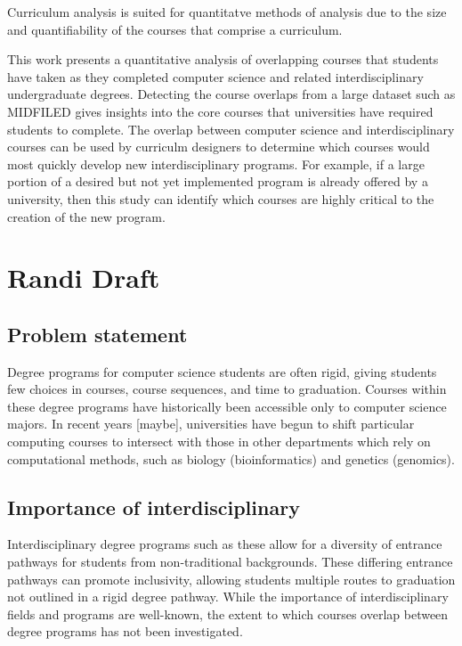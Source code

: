 \documentclass[
  journal,
]{IEEEtran}%
\begin{document}
Curriculum analysis is suited for quantitatve methods of analysis due to
the size and quantifiability of the courses that comprise a curriculum.

This work presents a quantitative analysis of overlapping courses that
students have taken as they completed computer science and related
interdisciplinary undergraduate degrees. Detecting the course overlaps
from a large dataset such as MIDFILED gives insights into the core
courses that universities have required students to complete. The
overlap between computer science and interdisciplinary courses can be
used by curriculm designers to determine which courses would most
quickly develop new interdisciplinary programs. For example, if a large
portion of a desired but not yet implemented program is already offered
by a university, then this study can identify which courses are highly
critical to the creation of the new program.

\hypertarget{randi-draft}{%
\section{Randi Draft}\label{randi-draft}}

\hypertarget{problem-statement}{%
\subsection{Problem statement}\label{problem-statement}}

Degree programs for computer science students are often rigid, giving
students few choices in courses, course sequences, and time to
graduation. Courses within these degree programs have historically been
accessible only to computer science majors. In recent years {[}maybe{]},
universities have begun to shift particular computing courses to
intersect with those in other departments which rely on computational
methods, such as biology (bioinformatics) and genetics (genomics).

\hypertarget{importance-of-interdisciplinary}{%
\subsection{Importance of
interdisciplinary}\label{importance-of-interdisciplinary}}

Interdisciplinary degree programs such as these allow for a diversity of
entrance pathways for students from non-traditional backgrounds. These
differing entrance pathways can promote inclusivity, allowing students
multiple routes to graduation not outlined in a rigid degree pathway.
While the importance of interdisciplinary fields and programs are
well-known, the extent to which courses overlap between degree programs
has not been investigated.
\end{document}
